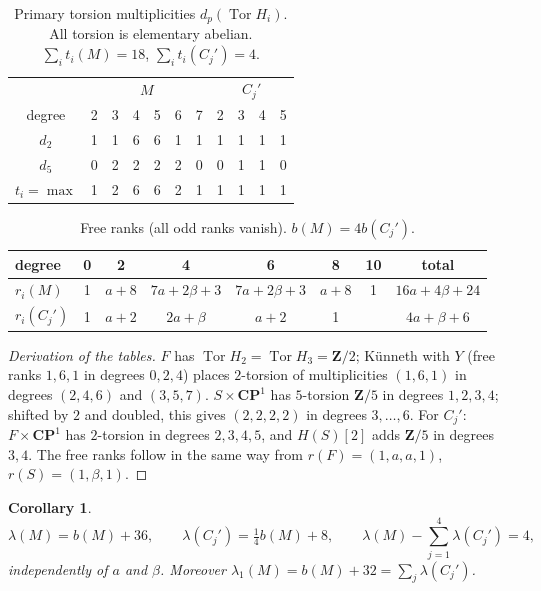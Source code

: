 \documentclass[11pt]{amsart}
\numberwithin{equation}{section}
\newtheorem{corollary}[theorem]{Corollary}
\theoremstyle{definition}
\theoremstyle{remark}
\newcommand{\CP}{\mathbf{CP}}
\newcommand{\Z}{\mathbf Z}
\DeclareMathOperator{\Tor}{Tor}
\begin{document}
\begin{table}[h]
\centering\small
\begin{tabular}{@{}c|cccccc|cccc@{}}
\toprule
 & \multicolumn{6}{c|}{$M$} & \multicolumn{4}{c}{$C_j'$}\\
degree & 2 & 3 & 4 & 5 & 6 & 7 & 2 & 3 & 4 & 5\\
\midrule
$d_2$ & 1 & 1 & 6 & 6 & 1 & 1 & 1 & 1 & 1 & 1\\
$d_5$ & 0 & 2 & 2 & 2 & 2 & 0 & 0 & 1 & 1 & 0\\
$t_i=\max$ & 1 & 2 & 6 & 6 & 2 & 1 & 1 & 1 & 1 & 1\\
\bottomrule
\end{tabular}
\caption{Primary torsion multiplicities $d_p(\Tor H_i)$. All torsion is
elementary abelian. $\sum_it_i(M)=18$, $\sum_it_i(C_j')=4$.}
\label{tab:torsion}
\end{table}

\begin{table}[h]
\centering\small
\begin{tabular}{@{}lccccccc@{}}
\toprule
degree & 0 & 2 & 4 & 6 & 8 & 10 & total\\
\midrule
$r_i(M)$ & 1 & $a+8$ & $7a+2\beta+3$ & $7a+2\beta+3$ & $a+8$ & 1 & $16a+4\beta+24$\\
$r_i(C_j')$ & 1 & $a+2$ & $2a+\beta$ & $a+2$ & 1 & & $4a+\beta+6$\\
\bottomrule
\end{tabular}
\caption{Free ranks (all odd ranks vanish). $b(M)=4b(C_j')$.}
\label{tab:free}
\end{table}

\begin{proof}[Derivation of the tables]
$F$ has $\Tor H_2=\Tor H_3=\Z/2$; Künneth with $Y$ (free ranks $1,6,1$ in
degrees $0,2,4$) places $2$-torsion of multiplicities $(1,6,1)$ in degrees
$(2,4,6)$ and $(3,5,7)$. $S\times\CP^1$ has $5$-torsion $\Z/5$ in degrees
$1,2,3,4$; shifted by $2$ and doubled, this gives $(2,2,2,2)$ in degrees
$3,\dots,6$. For $C_j'$: $F\times\CP^1$ has $2$-torsion in degrees $2,3,4,5$,
and $H(S)[2]$ adds $\Z/5$ in degrees $3,4$. The free ranks follow in the
same way from $r(F)=(1,a,a,1)$, $r(S)=(1,\beta,1)$.
\end{proof}

\begin{corollary}\label{cor:counts}
\[
  \lambda(M)=b(M)+36,\qquad \lambda(C_j')=\tfrac14b(M)+8,\qquad
  \lambda(M)-\sum_{j=1}^4\lambda(C_j')=4,
\]
independently of $a$ and $\beta$. Moreover $\lambda_1(M)=b(M)+32=
\sum_j\lambda(C_j')$.
\end{corollary}
\end{document}
